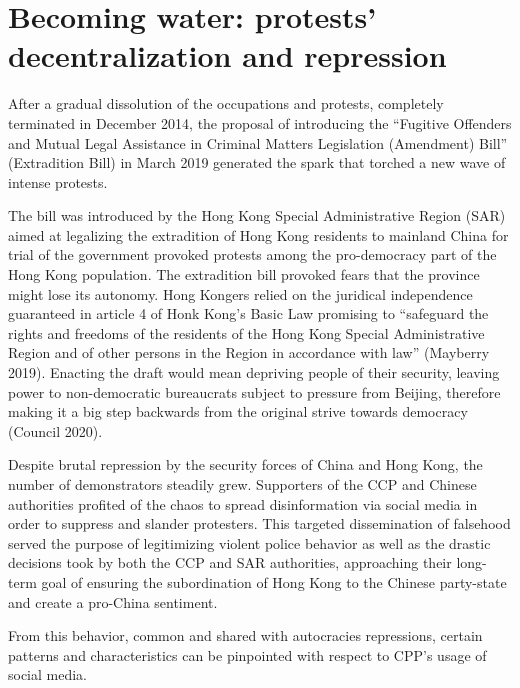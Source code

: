 \documentclass[
  a4paper,
]{book}
\begin{document}
\hypertarget{becoming-water-protests-decentralization-and-repression}{%
\section{Becoming water: protests' decentralization and repression}\label{becoming-water-protests-decentralization-and-repression}}

After a gradual dissolution of the occupations and protests, completely terminated in December 2014, the proposal of introducing the ``Fugitive Offenders and Mutual Legal Assistance in Criminal Matters Legislation (Amendment) Bill'' (Extradition Bill) in March 2019 generated the spark that torched a new wave of intense protests.

The bill was introduced by the Hong Kong Special Administrative Region (SAR) aimed at legalizing the extradition of Hong Kong residents to mainland China for trial of the government provoked protests among the pro-democracy part of the Hong Kong population. The extradition bill provoked fears that the province might lose its autonomy. Hong Kongers relied on the juridical independence guaranteed in article 4 of Honk Kong's Basic Law promising to ``safeguard the rights and freedoms of the residents of the Hong Kong Special Administrative Region and of other persons in the Region in accordance with law'' {(Mayberry 2019)}. Enacting the draft would mean depriving people of their security, leaving power to non-democratic bureaucrats subject to pressure from Beijing, therefore making it a big step backwards from the original strive towards democracy {(Council 2020)}.

Despite brutal repression by the security forces of China and Hong Kong, the number of demonstrators steadily grew. Supporters of the CCP and Chinese authorities profited of the chaos to spread disinformation via social media in order to suppress and slander protesters. This targeted dissemination of falsehood served the purpose of legitimizing violent police behavior as well as the drastic decisions took by both the CCP and SAR authorities, approaching their long-term goal of ensuring the subordination of Hong Kong to the Chinese party-state and create a pro-China sentiment.

From this behavior, common and shared with autocracies repressions, certain patterns and characteristics can be pinpointed with respect to CPP's usage of social media.
\end{document}
